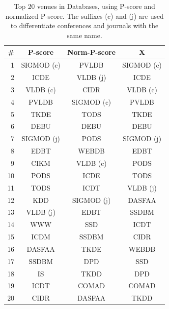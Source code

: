 \begin{table}[htbp]
\centering
\caption{Top 20 venues in Databases, using P-score and normalized P-score. The suffixes (c) and (j) are used to differentiate conferences and journals with the same name.}
\label{tab:db-venues}
\begin{tabular}{rccc}
\toprule
\#		&		P-score		&		Norm-P-score&		X			\\ \hline
1		&		SIGMOD (c)	&		PVLDB		&		SIGMOD (c)	\\
2		&		ICDE		&		VLDB (j)	&		ICDE		\\
3		&		VLDB (c)	&		CIDR		&		VLDB (c)	\\
4		&		PVLDB		&		SIGMOD (c)	&		PVLDB		\\
5		&		TKDE		&		TODS		&		TKDE		\\
6		&		DEBU		&		DEBU		&		DEBU		\\
7		&		SIGMOD (j)	&		PODS		&		SIGMOD (j)	\\
8		&		EDBT		&		WEBDB		&		EDBT		\\
9		&		CIKM		&		VLDB (c)	&		PODS		\\
10		&		PODS		&		ICDE		&		TODS		\\
11		&		TODS		&		ICDT		&		VLDB (j)	\\
12		&		KDD			&		SIGMOD (j)	&		DASFAA		\\
13		&		VLDB (j)	&		EDBT		&		SSDBM		\\
14		&		WWW			&		SSD			&		ICDT		\\
15		&		ICDM		&		SSDBM		&		CIDR		\\
16		&		DASFAA		&		TKDE		&		WEBDB		\\
17		&		SSDBM		&		DPD			&		SSD			\\
18		&		IS			&		TKDD		&		DPD			\\
19		&		ICDT		&		COMAD		&		COMAD		\\
20		&		CIDR		&		DASFAA		&		TKDD		\\
\bottomrule


\end{tabular}
\end{table}
